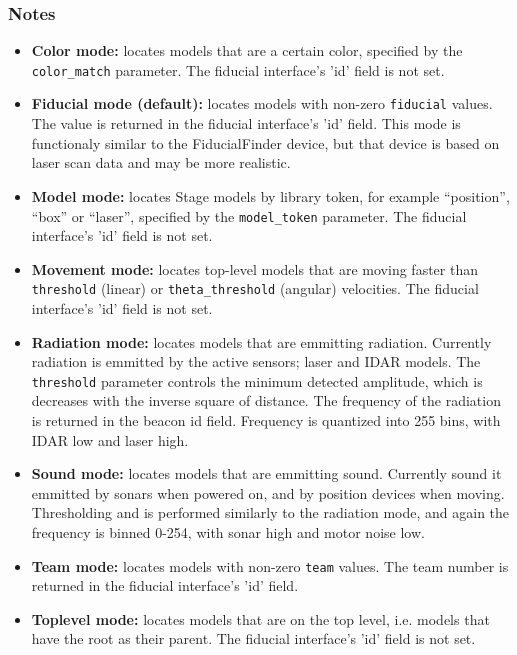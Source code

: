 \documentclass[11pt,twoside]{report}
\begin{document}
\subsubsection*{Notes}
\begin{itemize}
\item {\bf Color mode: } locates models that are a certain color,
specified by the \verb'color_match' parameter. The fiducial
interface's 'id' field is not set.

\item {\bf Fiducial mode (default): } locates models with non-zero
\verb'fiducial' values. The value is returned in the fiducial
interface's 'id' field. This mode is functionaly similar to the
FiducialFinder device, but that device is based on laser scan data and
may be more realistic.

\item {\bf Model mode: } locates Stage models by library
token, for example ``position'', ``box'' or ``laser'', specified by
the \verb'model_token' parameter.  The fiducial interface's 'id' field
is not set.

\item {\bf Movement mode: } locates top-level models that are moving
faster than \verb'threshold' (linear) or \verb'theta_threshold'
(angular) velocities. The fiducial interface's 'id' field is not set.

\item {\bf Radiation mode: } locates models that are emmitting radiation. Currently
radiation is emmitted by the active sensors; laser and IDAR models. The \verb'threshold' parameter controls the minimum detected amplitude, which is decreases with the inverse square of distance. The frequency of the radiation is returned in the beacon id field. Frequency is quantized into 255 bins, with IDAR low and laser high. 

\item {\bf Sound mode: } locates models that are emmitting sound. Currently sound it emmitted by sonars when powered on, and by position devices when moving. Thresholding and is performed similarly to the radiation mode, and again the frequency is binned 0-254, with sonar high and motor noise low.

\item {\bf Team mode: } locates models with non-zero \verb'team'
values. The team number is returned in the fiducial interface's 'id'
field.

\item {\bf Toplevel mode: } locates models that are on the top level,
i.e. models that have the root as their parent. The fiducial interface's 'id' field is
not set.


\end{itemize}
\end{document}
